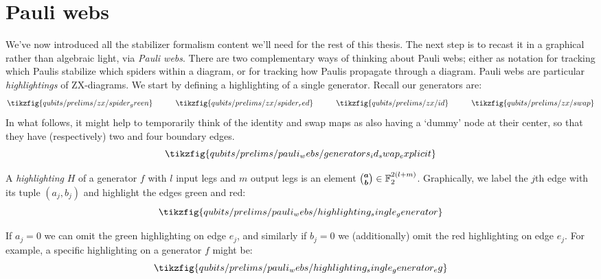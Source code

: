 \section{Pauli webs}\label{sec:pauli-webs}

We've now introduced all the stabilizer formalism content we'll need for the rest of this thesis.
The next step is to recast it in a graphical rather than algebraic light, via \textit{Pauli webs}.
There are two complementary ways of thinking about Pauli webs; either as notation for tracking which Paulis stabilize which spiders within a diagram, or for tracking how Paulis propagate through a diagram.
Pauli webs are particular \textit{highlightings} of ZX-diagrams.
We start by defining a highlighting of a single generator.
Recall our generators are:
\begin{equation}
    \begin{aligned}
        \tikzfig{qubits/prelims/zx/spider_green}
        \qqquad
        \tikzfig{qubits/prelims/zx/spider_red}
        \qqquad
        \tikzfig{qubits/prelims/zx/id}
        \qqquad
        \tikzfig{qubits/prelims/zx/swap}
    \end{aligned}
\end{equation}
In what follows, it might help to temporarily think of the identity and swap maps as also having a `dummy' node at their center, so that they have (respectively) two and four boundary edges.
\begin{equation}\label{eq:qubit_generators_id_swap_explicit}
    \tikzfig{qubits/prelims/pauli_webs/generators_id_swap_explicit}
\end{equation}

\begin{definition}\label{defn:highlighting_single_generator}
    A \textit{highlighting} $H$ of a generator $f$ with $l$ input legs and $m$ output legs is an element $\tbinom{\boldsymbol{a}}{\boldsymbol{b}} \in \mathbb{F}_2^{2(l+m)}$.
    Graphically, we label the $j$th edge with its tuple $(a_j, b_j)$ and highlight the edges green and red:
    \begin{equation}
        \tikzfig{qubits/prelims/pauli_webs/highlighting_single_generator}
    \end{equation}
\end{definition}

If $a_j = 0$ we can omit the green highlighting on edge $e_j$, and similarly if $b_j = 0$ we (additionally) omit the red highlighting on edge $e_j$.
For example, a specific highlighting on a generator $f$ might be:
\begin{equation}
    \tikzfig{qubits/prelims/pauli_webs/highlighting_single_generator_eg}
\end{equation}


